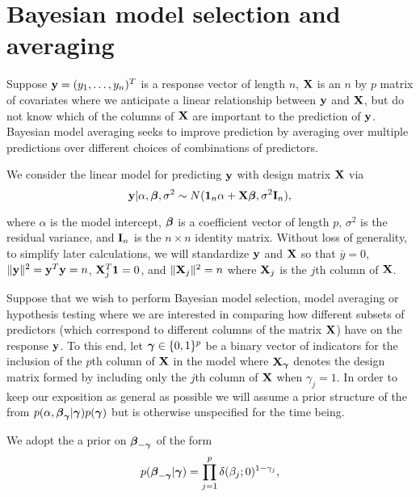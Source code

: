  



 
 

\section{Bayesian model selection and averaging}
\label{sec:bma}



Suppose ${\bf y} = (y_1,\ldots,y_n)^T$ is a response vector of length $n$, ${\bf X}$ is an $n$ by $p$ matrix 
of covariates where we anticipate a linear relationship between ${\bf y}$ and ${\bf X}$, but do not know
which of the columns of ${\bf X}$ are important to the prediction of ${\bf y}$.
Bayesian model averaging seeks to improve prediction by averaging over multiple
predictions over different choices of combinations of predictors.

We consider the linear model for predicting ${\bf y}$ with design matrix ${\bf X}$ via
\begin{equation}
\label{eq:linearModel}
{\bf y} | \alpha, {\boldsymbol \beta}, \sigma^2 \sim N({\bf 1}_n\alpha + {\bf X} {\boldsymbol \beta}, \sigma^2 {\bf I}_n),
\end{equation} 


\noindent where $\alpha$ is the model intercept, ${\boldsymbol \beta}$ is a coefficient vector of length $p$, 
$\sigma^2$ is the residual variance, and ${\bf I}_n$ is the $n \times n$ identity matrix. 
Without loss of generality, to simplify later calculations, we will standardize ${\bf y}$ and ${\bf X}$ 
so that $\overline{y} = 0$, 
$\|{\bf y}\|^2 = {\bf y}^T{\bf y} = n$, ${\bf X}_j^T{\bf 1} = 0$,  and $\|{\bf X}_j\|^2 = n$ where ${\bf X}_j$ is the $j$th 
column of ${\bf X}$. 


Suppose that we wish to perform Bayesian model selection, model averaging or hypothesis 
testing where we are interested in comparing how different subsets of predictors 
(which correspond to different columns of the matrix ${\bf X}$) have on the response ${\bf y}$. To this end, 
let ${\boldsymbol \gamma} \in \{0, 1\}^p$ be a binary vector of indicators for the inclusion of the $p$th column 
of ${\bf X}$ in the model where ${\bf X}_{\boldsymbol \gamma}$ denotes the design matrix formed by including only the 
$j$th column of ${\bf X}$ when $\gamma_j = 1$. 
In order to keep our exposition as general as possible we will assume a prior structure of
the from 
$p(\alpha,{\boldsymbol \beta}_{{\boldsymbol \gamma}}|{\boldsymbol \gamma})p({\boldsymbol \gamma})$ but is otherwise unspecified for
the time being. 

We adopt the a prior on ${\boldsymbol \beta}_{-{\boldsymbol \gamma}}$  
of the form
\begin{equation}
\label{eq:spikeAndSlab}
\displaystyle p({\boldsymbol \beta}_{-{\boldsymbol \gamma}}|{\boldsymbol \gamma}) = \prod_{j=1}^p \delta(\beta_j;0)^{1-\gamma_j},
\end{equation} 

